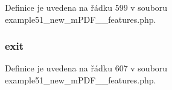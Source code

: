 Definice je uvedena na řádku 599 v souboru example51\-\_\-new\-\_\-m\-P\-D\-F\-\_\-\_\-features.\-php.

\hypertarget{example51__new__m_p_d_f__4__features_8php_a6733eb5f605d09eaede9845835d71c4e}{
\subsubsection[{exit}]{\setlength{\rightskip}{0pt plus 5cm}exit}}\label{example51__new__m_p_d_f__4__features_8php_a6733eb5f605d09eaede9845835d71c4e}


Definice je uvedena na řádku 607 v souboru example51\-\_\-new\-\_\-m\-P\-D\-F\-\_\-\_\-features.\-php.

